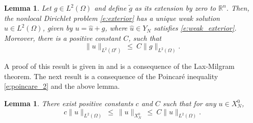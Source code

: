 \documentclass[11pt]{amsart}   	%
\theoremstyle{plain}
\numberwithin{equation}{section}
\newtheorem{lemma}[thm]{Lemma}
\def\R{\mathbb{R}}
\newcommand{\JMS}[1]{{\color{orange} {\bf J. Siktar:} [#1] }}
\begin{document}
\begin{lemma}\label{l:exteriorproblem}
Let $g \in L^2(\Omega)$ and define $\tilde{g}$ as its extension by zero to $\R^n$. Then, the nonlocal Dirichlet problem \eqref{e:exterior} has a unique weak solution $u \in L^2(\Omega)$, given by $u = \hat{u} + g$, where $\hat{u} \in Y_N$ satisfies \eqref{e:weak_exterior}. Moreover, there is a positive constant $C$, such that
\[ \| u\|_{L^2(\Omega^c)} \ \leq \ C \|g\|_{L^2(\Omega)}.\]
\end{lemma}
A proof of this result is given in \cite[Lemma 3.1]{cappanera2024analysis}  and is a consequence of the Lax-Milgram theorem.
The next result is a consequence of the Poincar{\'e} inequality \eqref{e:poincare_2} and the above lemma.
\begin{lemma}\label{l:equivalent_normsN}
There exist positive constants $c$ and $C$ such that for any $u \in X^0_N$,
\[ c\|u\|_{L^2(\Omega)} \ \leq \ \| u\|_{X^0_N} \ \leq \  C\|u\|_{L^2(\Omega)}.\]
\end{lemma}
\end{document}
